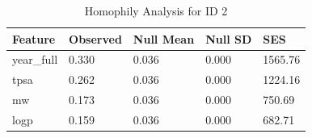 \begin{table}
\caption{Homophily Analysis for ID 2}
\label{tab:homophily_id2}
\begin{tabular}{lllll}
\toprule
Feature & Observed & Null Mean & Null SD & SES \\
\midrule
year_full & 0.330 & 0.036 & 0.000 & 1565.76 \\
tpsa & 0.262 & 0.036 & 0.000 & 1224.16 \\
mw & 0.173 & 0.036 & 0.000 & 750.69 \\
logp & 0.159 & 0.036 & 0.000 & 682.71 \\
\bottomrule
\end{tabular}
\end{table}

